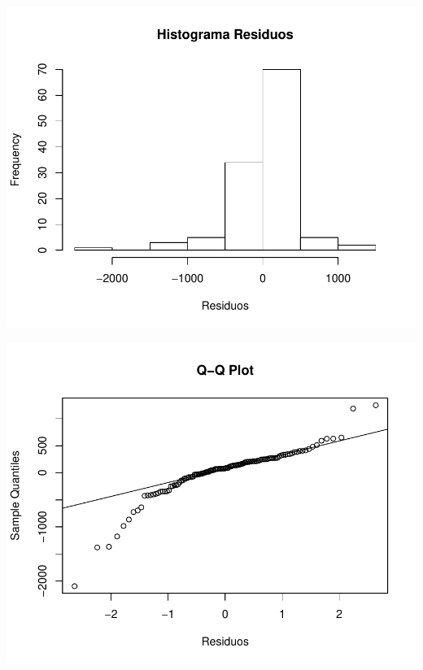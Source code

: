 \documentclass[11pt,a4paper,oneside]{article}\usepackage[]{graphicx}\usepackage[]{color}
\makeatletter
\def\maxwidth{ %
  \ifdim\Gin@nat@width>\linewidth
    \linewidth
  \else
    \Gin@nat@width
  \fi
}
\newenvironment{knitrout}{}{} %
\makeatother
\begin{document}
\begin{knitrout}
{\centering \includegraphics[width=\maxwidth]{figure/unnamed-chunk-16-65} 

}




{\centering \includegraphics[width=\maxwidth]{figure/unnamed-chunk-16-66} 

}





\end{knitrout}
\end{document}
